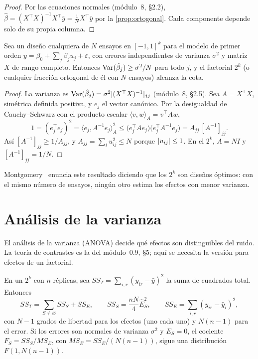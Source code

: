 \begin{proof}
Por las ecuaciones normales (módulo~8, §2.2), $\hat\beta=(X^\top X)^{-1}X^\top\bar y=\frac1N X^\top\bar y$ por la \cref{prop:ortogonal}. Cada componente depende solo de su propia columna.
\end{proof}

\begin{teorema}\label{teo:doptimo}
Sea un diseño cualquiera de $N$ ensayos en $[-1,1]^{k}$ para el modelo de primer orden $y=\beta_0+\sum_j\beta_ju_j+\varepsilon$, con errores independientes de varianza $\sigma^2$ y matriz $X$ de rango completo. Entonces $\operatorname{Var}(\hat\beta_j)\ge\sigma^2/N$ para todo $j$, y el factorial $2^k$ (o cualquier fracción ortogonal de él con $N$ ensayos) alcanza la cota.
\end{teorema}

\begin{proof}
La varianza es $\operatorname{Var}(\hat\beta_j)=\sigma^2[(X^\top X)^{-1}]_{jj}$ (módulo~8, §2.5). Sea $A=X^\top X$, simétrica definida positiva, y $e_j$ el vector canónico. Por la desigualdad de Cauchy--Schwarz con el producto escalar $\langle v,w\rangle_A=v^\top A w$,
\[
1=(e_j^\top e_j)^2=\bigl\langle e_j,A^{-1}e_j\bigr\rangle_A^2\le\bigl(e_j^\top A e_j\bigr)\bigl(e_j^\top A^{-1}e_j\bigr)=A_{jj}\,[A^{-1}]_{jj}.
\]
Así $[A^{-1}]_{jj}\ge 1/A_{jj}$, y $A_{jj}=\sum_i u_{ij}^2\le N$ porque $\lvert u_{ij}\rvert\le 1$. En el $2^k$, $A=NI$ y $[A^{-1}]_{jj}=1/N$.
\end{proof}

Montgomery~\cite[§6.7]{montgomery} enuncia este resultado diciendo que los $2^k$ son diseños óptimos: con el mismo número de ensayos, ningún otro estima los efectos con menor varianza.

\section{Análisis de la varianza}

El análisis de la varianza (ANOVA) decide qué efectos son distinguibles del ruido. La teoría de contrastes es la del módulo~0.9, §5; aquí se necesita la versión para efectos de un factorial.

\begin{proposicion}\label{prop:anova}
En un $2^k$ con $n$ réplicas, sea $SS_T=\sum_{i,r}(y_{ir}-\bar y)^2$ la suma de cuadrados total. Entonces
\[
SS_T=\sum_{S\ne\varnothing}SS_S+SS_E,\qquad SS_S=\frac{nN}{4}\hat E_S^{2},\qquad SS_E=\sum_{i,r}(y_{ir}-\bar y_i)^2,
\]
con $N-1$ grados de libertad para los efectos (uno cada uno) y $N(n-1)$ para el error. Si los errores son normales de varianza $\sigma^2$ y $E_S=0$, el cociente $F_S=SS_S/MS_E$, con $MS_E=SS_E/(N(n-1))$, sigue una distribución $F(1,N(n-1))$.
\end{proposicion}

